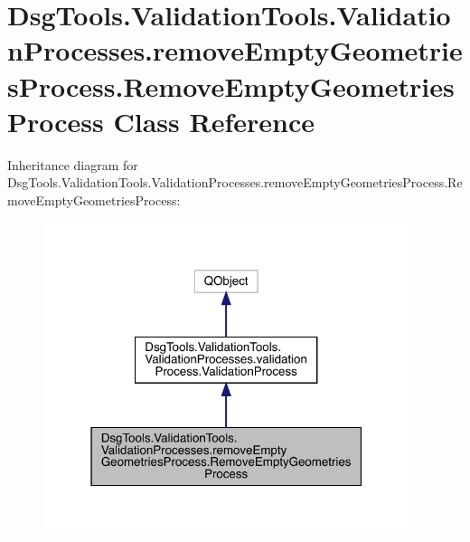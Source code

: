 \hypertarget{class_dsg_tools_1_1_validation_tools_1_1_validation_processes_1_1remove_empty_geometries_process8df81d6329df1977586c69f5653d5861}{}\section{Dsg\+Tools.\+Validation\+Tools.\+Validation\+Processes.\+remove\+Empty\+Geometries\+Process.\+Remove\+Empty\+Geometries\+Process Class Reference}
\label{class_dsg_tools_1_1_validation_tools_1_1_validation_processes_1_1remove_empty_geometries_process8df81d6329df1977586c69f5653d5861}


Inheritance diagram for Dsg\+Tools.\+Validation\+Tools.\+Validation\+Processes.\+remove\+Empty\+Geometries\+Process.\+Remove\+Empty\+Geometries\+Process\+:
\nopagebreak
\begin{figure}[H]
\begin{center}
\leavevmode
\includegraphics[width=304pt]{class_dsg_tools_1_1_validation_tools_1_1_validation_processes_1_1remove_empty_geometries_processc0cb2a820356ad9ca5a3cf36c8487dc5}
\end{center}
\end{figure}


